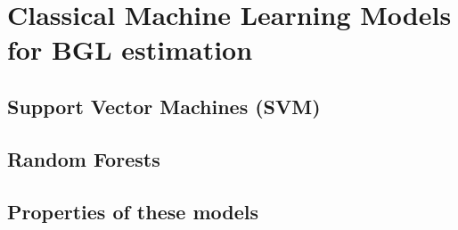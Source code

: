 
\chapter{Classical Machine Learning Models for BGL estimation}
\label{cha:Classical Machine Learning Models for BGL estimation}

\section{Support Vector Machines (SVM)}
\label{sec:Support Vector Machines (SVM)}

\section{Random Forests}
\label{sec:Random Forests}

\section{Properties of these models}
\label{sec:Properties of these models}